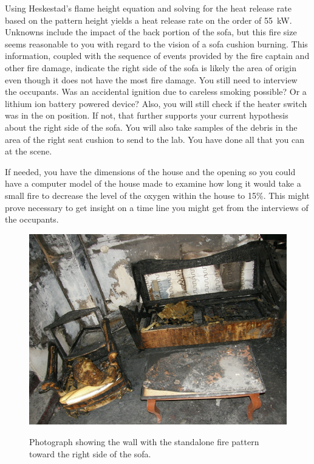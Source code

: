 \documentclass[twoside]{uocthesis}
\begin{document}
{Using Heskestad's flame height equation and solving for the heat release rate based on the pattern height yields a heat release rate on the order of 55~kW. Unknowns include the impact of the back portion of the sofa, but this fire size seems reasonable to you with regard to the vision of a sofa cushion burning. This information, coupled with the sequence of events provided by the fire captain and other fire damage, indicate the right side of the sofa is likely the area of origin even though it does not have the most fire damage.  You still need to interview the occupants.  Was an accidental ignition due to careless smoking possible? Or a lithium ion battery powered device?  Also, you will still check if the heater switch was in the on position.  If not, that further supports your current hypothesis about the right side of the sofa.  You will also take samples of the debris in the area of the right seat cushion to send to the lab.  You have done all that you can at the scene.  

If needed, you have the dimensions of the house and the opening so you could have a computer model of the house made to examine how long it would take a small fire to decrease the level of the oxygen within the house to 15\%.  This might prove necessary to get insight on a time line you might get from the interviews of the occupants. 

\begin{figure}[h]
	\includegraphics[width=5in]{../Figures/Pre_Flashover_Pattern} \\
	\caption[Photograph showing the wall with the stand alone fire pattern toward the right side of the sofa.]{Photograph showing the wall with the standalone fire pattern toward the right side of the sofa.}
	\label{Pre_Flashover_Pattern}
\end{figure}

}
\end{document}
